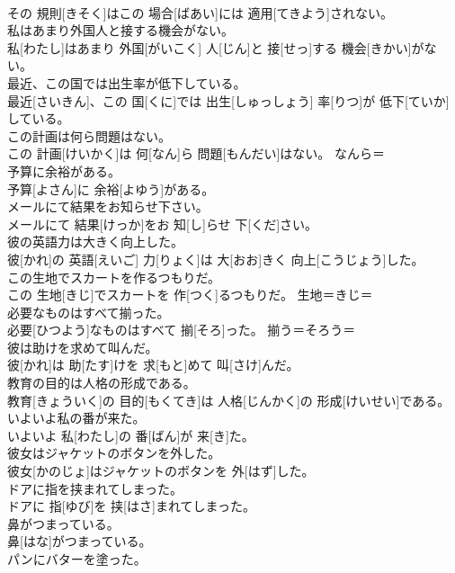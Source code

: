 \documentclass[8pt]{extreport}
\begin{document}
\begin{CJK}{UTF8}{min}
\\	その 規則[きそく]はこの 場合[ばあい]には 適用[てきよう]されない。	
\\	私はあまり外国人と接する機会がない。	
\\	私[わたし]はあまり 外国[がいこく] 人[じん]と 接[せっ]する 機会[きかい]がない。	
\\	最近、この国では出生率が低下している。	
\\	最近[さいきん]、この 国[くに]では 出生[しゅっしょう] 率[りつ]が 低下[ていか]している。	
\\	この計画は何ら問題はない。	
\\	この 計画[けいかく]は 何[なん]ら 問題[もんだい]はない。	なんら＝ 
\\	予算に余裕がある。	
\\	予算[よさん]に 余裕[よゆう]がある。	
\\	メールにて結果をお知らせ下さい。	
\\	メールにて 結果[けっか]をお 知[し]らせ 下[くだ]さい。	
\\	彼の英語力は大きく向上した。	
\\	彼[かれ]の 英語[えいご] 力[りょく]は 大[おお]きく 向上[こうじょう]した。	
\\	この生地でスカートを作るつもりだ。	
\\	この 生地[きじ]でスカートを 作[つく]るつもりだ。	生地＝きじ＝ 
\\	必要なものはすべて揃った。	
\\	必要[ひつよう]なものはすべて 揃[そろ]った。	揃う＝そろう＝ 
\\	彼は助けを求めて叫んだ。	
\\	彼[かれ]は 助[たす]けを 求[もと]めて 叫[さけ]んだ。	
\\	教育の目的は人格の形成である。	
\\	教育[きょういく]の 目的[もくてき]は 人格[じんかく]の 形成[けいせい]である。	
\\	いよいよ私の番が来た。	
\\	いよいよ 私[わたし]の 番[ばん]が 来[き]た。	
\\	彼女はジャケットのボタンを外した。	
\\	彼女[かのじょ]はジャケットのボタンを 外[はず]した。	
\\	ドアに指を挟まれてしまった。	
\\	ドアに 指[ゆび]を 挟[はさ]まれてしまった。	
\\	鼻がつまっている。	
\\	鼻[はな]がつまっている。	
\\	パンにバターを塗った。	

\end{CJK}
\end{document}
